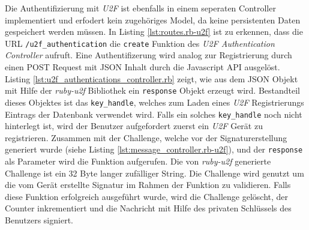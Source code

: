 \documentclass[11pt,a4paper,ngerman]{scrreprt}
\begin{document}
Die Authentifizierung mit \textit{U2F} ist ebenfalls in einem seperaten Controller implementiert und erfodert kein zugehöriges Model, da keine persistenten Daten gespeichert werden müssen. In Listing \ref{lst:routes.rb-u2f} ist zu erkennen, dass die URL \texttt{/u2f\_authentication} die \texttt{create} Funktion des \textit{U2F Authentication Controller} aufruft. Eine Authentifizerung wird analog zur Registrierung durch einen POST Request mit JSON Inhalt durch die Javascript API ausgelöst. Listing \ref{lst:u2f_authentications_controller.rb} zeigt, wie aus dem JSON Objekt mit Hilfe der \textit{ruby-u2f} Bibliothek ein \texttt{response} Objekt erzeugt wird. Bestandteil dieses Objektes ist das \texttt{key\_handle}, welches zum Laden eines \textit{U2F} Registrierungs Eintrags der Datenbank verwendet wird. Falls ein solches \texttt{key\_handle} noch nicht hinterlegt ist, wird der Benutzer aufgefordert zuerst ein \textit{U2F} Gerät zu registrieren. Zusammen mit der Challenge, welche vor der Signaturerstellung generiert wurde (siehe Listing \ref{lst:message_controller.rb-u2f}), und der \texttt{response} als Parameter wird die  Funktion aufgerufen. Die von \textit{ruby-u2f} generierte Challenge ist ein 32 Byte langer zufälliger String. Die Challenge wird genutzt um die vom Gerät erstellte Signatur im Rahmen der  Funktion zu validieren. Falls diese Funktion erfolgreich ausgeführt wurde, wird die Challenge gelöscht, der Counter inkrementiert und die Nachricht mit Hilfe des privaten Schlüssels des Benutzers signiert.
\end{document}
